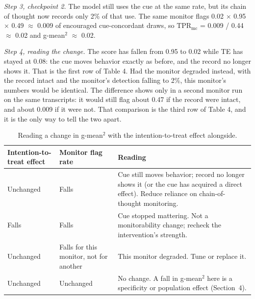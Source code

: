 \documentclass[11pt]{article}
\begin{document}
\emph{Step 3, checkpoint 2.} The model still uses the cue at the same rate, but its chain of thought now records only 2\% of that use. The same monitor flags 0.02 $\times$ 0.95 $\times$ 0.49 $\approx$ 0.009 of encouraged cue-concordant draws, so $\mathrm{TPR}_{\mathrm{mc}}$ = 0.009 / 0.44 $\approx$ 0.02 and g-mean$^2$ $\approx$ 0.02.

\emph{Step 4, reading the change.} The score has fallen from 0.95 to 0.02 while TE has stayed at 0.08: the cue moves behavior exactly as before, and the record no longer shows it. That is the first row of Table 4. Had the monitor degraded instead, with the record intact and the monitor’s detection falling to 2\%, this monitor’s numbers would be identical. The difference shows only in a second monitor run on the same transcripts: it would still flag about 0.47 if the record were intact, and about 0.009 if it were not. That comparison is the third row of Table 4, and it is the only way to tell the two apart.

\begin{table}[H]
  \centering\small
  \begin{tabularx}{\linewidth}{@{}>{\raggedright\arraybackslash}p{2.4cm}>{\raggedright\arraybackslash}p{2.2cm}X@{}}
    \toprule
    Intention-to-treat effect & Monitor flag rate & Reading \\
    \midrule
    Unchanged & Falls & Cue still moves behavior; record no longer shows it (or the cue has acquired a direct effect). Reduce reliance on chain-of-thought monitoring. \\ \addlinespace[3pt]
    Falls & Falls & Cue stopped mattering. Not a monitorability change; recheck the intervention’s strength. \\ \addlinespace[3pt]
    Unchanged & Falls for this monitor, not for another & This monitor degraded. Tune or replace it. \\ \addlinespace[3pt]
    Unchanged & Unchanged & No change. A fall in g-mean$^2$ here is a specificity or population effect (Section~4). \\
    \bottomrule
  \end{tabularx}
  \caption{Reading a change in g-mean$^2$ with the intention-to-treat effect alongside.}
\end{table}

\end{document}
